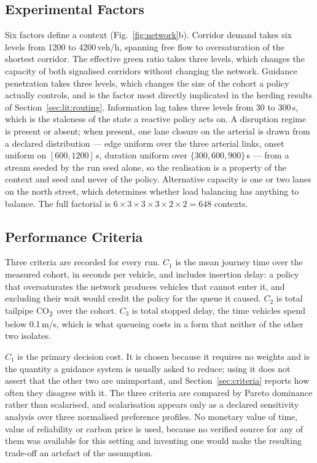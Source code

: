 \documentclass[preprint,12pt]{elsarticle}
\newcommand{\CO}{CO\textsubscript{2}}
\begin{document}
\subsection{Experimental Factors}
\label{sec:method:fac}

Six factors define a context (Fig.~\ref{fig:network}b). Corridor demand takes
six levels from 1200 to 4200\,veh/h, spanning free flow to oversaturation of the
shortest corridor. The effective green ratio takes three levels, which changes
the capacity of both signalised corridors without changing the network. Guidance
penetration takes three levels, which changes the size of the cohort a policy
actually controls, and is the factor most directly implicated in the
herding results of Section~\ref{sec:lit:routing}. Information lag takes three
levels from 30 to 300\,s, which is the staleness of the state a reactive policy
acts on. A disruption regime is present or absent; when present, one lane closure
on the arterial is drawn from a declared distribution --- edge uniform over the
three arterial links, onset uniform on $[600,1200]$\,s, duration uniform over
$\{300,600,900\}$\,s --- from a stream seeded by the run seed alone, so the
realisation is a property of the context and seed and never of the policy.
Alternative capacity is one or two lanes on the north street, which determines
whether load balancing has anything to balance. The full factorial is
$6\times3\times3\times3\times2\times2 = 648$ contexts.

\subsection{Performance Criteria}
\label{sec:method:crit}

Three criteria are recorded for every run. $C_1$ is the mean journey time over
the measured cohort, in seconds per vehicle, and includes insertion delay: a
policy that oversaturates the network produces vehicles that cannot enter it, and
excluding their wait would credit the policy for the queue it caused. $C_2$ is
total tailpipe \CO\ over the cohort. $C_3$ is total stopped delay, the time
vehicles spend below 0.1\,m/s, which is what queueing costs in a form that
neither of the other two isolates.

$C_1$ is the primary decision cost. It is chosen because it requires no weights
and is the quantity a guidance system is usually asked to reduce; using it does
not assert that the other two are unimportant, and Section~\ref{sec:criteria}
reports how often they disagree with it. The three criteria are compared by
Pareto dominance rather than scalarised, and scalarisation appears only as a
declared sensitivity analysis over three normalised preference profiles. No
monetary value of time, value of reliability or carbon price is used, because no
verified source for any of them was available for this setting and inventing one
would make the resulting trade-off an artefact of the assumption.
\end{document}
